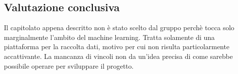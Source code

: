     \subsection{Valutazione conclusiva}
    Il capitolato appena descritto non è stato scelto dal gruppo perchè tocca solo marginalmente l'ambito del machine learning. Tratta solamente di una piattaforma per la raccolta dati, motivo per cui non risulta particolarmente accattivante. La mancanza di vincoli non da un'idea precisa di come sarebbe possibile operare per sviluppare il progetto.
